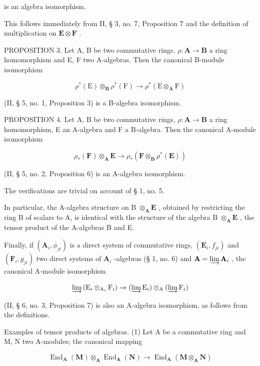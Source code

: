 is an algebra isomorphism.

This follows immediately from II, § 3, no. 7, Proposition 7 and the definition of multiplication on \(\mathbf{E} \otimes \mathbf{F}\) .

PROPOSITION 3. Let A, B be two commutative rings, \(\rho: \mathbf{A} \to \mathbf{B}\) a ring homomorphism and E, F two A-algebras. Then the canonical B-module isomorphism

\[
\rho^ {*} (\mathrm{E}) \otimes_ {\mathbf {B}} \rho^ {*} (\mathrm{F}) \rightarrow \rho^ {*} (\mathrm{E} \otimes_ {\mathbf {A}} \mathrm{F})
\]

(II, § 5, no. 1, Proposition 3) is a B-algebra isomorphism.

PROPOSITION 4. Let A, B be two commutative rings, \(\rho: \mathbf{A} \to \mathbf{B}\) a ring homomorphism, E an A-algebra and F a B-algebra. Then the canonical A-module isomorphism

\[
\rho_ {*} (\mathbf {F}) \otimes_ {\mathbf {A}} \mathbf {E} \rightarrow \rho_ {*} (\mathbf {F} \otimes_ {\mathbf {B}} \rho^ {*} (\mathbf {E}))
\]

(II, § 5, no. 2, Proposition 6) is an A-algebra isomorphism.

The verifications are trivial on account of § 1, no. 5.

In particular, the A-algebra structure on B \(\otimes_{\mathbf{A}} \mathbf{E}\) , obtained by restricting the ring B of scalars to A, is identical with the structure of the algebra B \(\otimes_{\mathbf{A}} \mathbf{E}\) , the tensor product of the A-algebras B and E.

Finally, if \((\mathbf{A}_i, \phi_{ji})\) is a direct system of commutative rings, \((\mathbf{E}_i, f_{ji})\) and \((\mathbf{F}_i, g_{ji})\) two direct systems of \(\mathbf{A}_i\) -algebras (§ 1, no. 6) and \(\mathbf{A} = \varinjlim \mathbf{A}_i\) , the canonical A-module isomorphism

\[
\varinjlim \left(\mathrm{E} _ {i} \otimes_ {\mathrm{A} _ {i}} \mathrm{F} _ {i}\right)\rightarrow (\varinjlim \mathrm{E} _ {i}) \otimes_ {\mathrm{A}} (\varinjlim \mathrm{F} _ {i})
\]

(II, § 6, no. 3, Proposition 7) is also an A-algebra isomorphism, as follows from the definitions.

Examples of tensor products of algebras. (1) Let A be a commutative ring and M, N two A-modules; the canonical mapping

\[
\operatorname{End} _ {\mathbf {A}} (\mathbf {M}) \otimes_ {\mathbf {A}} \operatorname{End} _ {\mathbf {A}} (\mathbf {N}) \rightarrow \operatorname{End} _ {\mathbf {A}} (\mathbf {M} \otimes_ {\mathbf {A}} \mathbf {N})\tag{2}
\]

